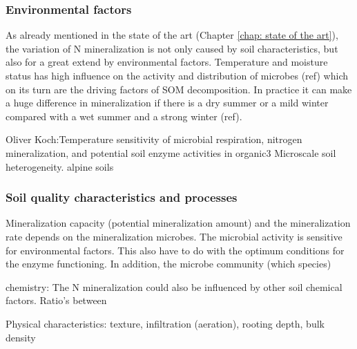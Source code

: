 \documentclass[10pt,twoside,dutch,english]{report}
\begin{document}
\subsubsection{Environmental factors}
    As already mentioned in the state of the art (Chapter \ref{chap: state of the art}), the variation of N mineralization is not only caused by soil characteristics, but also for a great extend by environmental factors. Temperature and moisture status has high influence on the activity and distribution of microbes (ref) which on its turn are the driving factors of SOM decomposition. 
In practice it can make a huge difference in mineralization if there is a dry summer or a mild winter compared with a wet summer and a strong winter (ref). 

Oliver Koch:Temperature sensitivity of microbial respiration, nitrogen
mineralization, and potential soil enzyme activities in organic3
Microscale soil heterogeneity. 
alpine soils
\subsubsection{Soil quality characteristics and processes}
Mineralization capacity (potential mineralization amount) and  the mineralization rate depends on the mineralization microbes. The microbial activity is sensitive for environmental factors. This also have to do with the optimum conditions for the enzyme functioning. In addition, the microbe community (which species) 
                            

	chemistry: 
The N mineralization could also be influenced by other soil chemical factors. Ratio's between

	Physical characteristics: texture, infiltration (aeration),  rooting depth, bulk density
\end{document}
